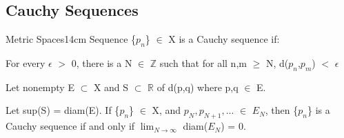 \subsection{ Cauchy Sequences }

    \begin{definition}{Metric Spaces}{14cm}
        Sequence \{$p_n$\} $\in$ X is a Cauchy sequence if:

        \hspace{0.5cm}
        For every $\epsilon$ $>$ 0, there is a N $\in$ $\mathbb{Z}$ such that
        for all n,m $\geq$ N, d($p_n$,$p_m$) $<$ $\epsilon$

        Let nonempty E $\subset$ X and S $\subset$ $\mathbb{R}$ of 
        d(p,q) where p,q $\in$ E.
        
        Let sup(S) = diam(E).
        If \{$p_n$\} $\in$ X, and $p_N, p_{N+1}, ... $ $\in$ $E_N$, then
        \{$p_n$\} is a Cauchy sequence if and only if
        $\lim_{N \rightarrow \infty}$ diam($E_N$) = 0.
    \end{definition}

    \newpage



